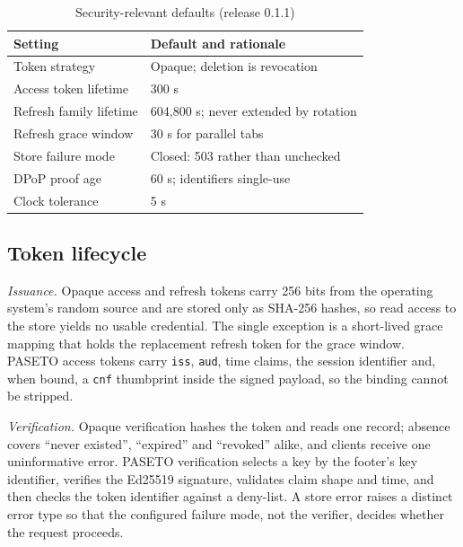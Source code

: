 \documentclass[conference]{IEEEtran}
\begin{document}
\begin{table}[htbp]
\caption{Security-relevant defaults (release 0.1.1)}
\begin{center}
\begin{tabular}{|l|l|}
\hline
\textbf{Setting} & \textbf{Default and rationale} \\
\hline
Token strategy & Opaque; deletion is revocation \\
Access token lifetime & 300 s \\
Refresh family lifetime & 604,800 s; never extended by rotation \\
Refresh grace window & 30 s for parallel tabs \\
Store failure mode & Closed: 503 rather than unchecked \\
DPoP proof age & 60 s; identifiers single-use \\
Clock tolerance & 5 s \\
\hline
\end{tabular}
\label{tab:defaults}
\end{center}
\end{table}

\subsection{Token lifecycle}
\emph{Issuance.} Opaque access and refresh tokens carry 256 bits from the operating system's random source and are stored only as SHA-256 hashes, so read access to the store yields no usable credential. The single exception is a short-lived grace mapping that holds the replacement refresh token for the grace window. PASETO access tokens carry \texttt{iss}, \texttt{aud}, time claims, the session identifier and, when bound, a \texttt{cnf} thumbprint inside the signed payload, so the binding cannot be stripped.

\emph{Verification.} Opaque verification hashes the token and reads one record; absence covers ``never existed'', ``expired'' and ``revoked'' alike, and clients receive one uninformative error. PASETO verification selects a key by the footer's key identifier, verifies the Ed25519 signature, validates claim shape and time, and then checks the token identifier against a deny-list. A store error raises a distinct error type so that the configured failure mode, not the verifier, decides whether the request proceeds.
\end{document}
